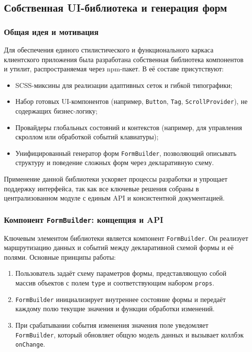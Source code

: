 \subsection{Собственная UI-библиотека и генерация форм}

\subsubsection{Общая идея и мотивация}
Для обеспечения единого стилистического и функционального каркаса клиентского приложения была разработана собственная библиотека компонентов и утилит, распространяемая через npm-пакет. В её составе присутствуют:
\begin{itemize}
	\item SCSS-миксины для реализации адаптивных сеток и гибкой типографики;
	\item Набор готовых UI-компонентов (например, \texttt{Button}, \texttt{Tag}, \texttt{ScrollProvider}), не содержащих бизнес-логику;
	\item Провайдеры глобальных состояний и контекстов (например, для управления скроллом или обработкой событий клавиатуры);
	\item Унифицированный генератор форм \texttt{FormBuilder}, позволяющий описывать структуру и поведение сложных форм через декларативную схему.
\end{itemize}
Применение данной библиотеки ускоряет процессы разработки и упрощает поддержку интерфейса, так как все ключевые решения собраны в централизованном модуле с единым API и консистентной документацией.

\subsubsection{Компонент \texttt{FormBuilder}: концепция и API}
Ключевым элементом библиотеки является компонент \texttt{FormBuilder}. Он реализует маршрутизацию данных и событий между декларативной схемой формы и её полями. Основные принципы работы:
\begin{enumerate}
	\item Пользователь задаёт схему параметров формы, представляющую собой массив объектов с полем \texttt{type} и соответствующим набором \texttt{props}.
	\item \texttt{FormBuilder} инициализирует внутреннее состояние формы и передаёт каждому полю текущие значения и функции обработки изменений.
	\item При срабатывании события изменения значения поле уведомляет \texttt{FormBuilder}, который обновляет общую модель данных и вызывает коллбэк \texttt{onChange}.
\end{enumerate}

